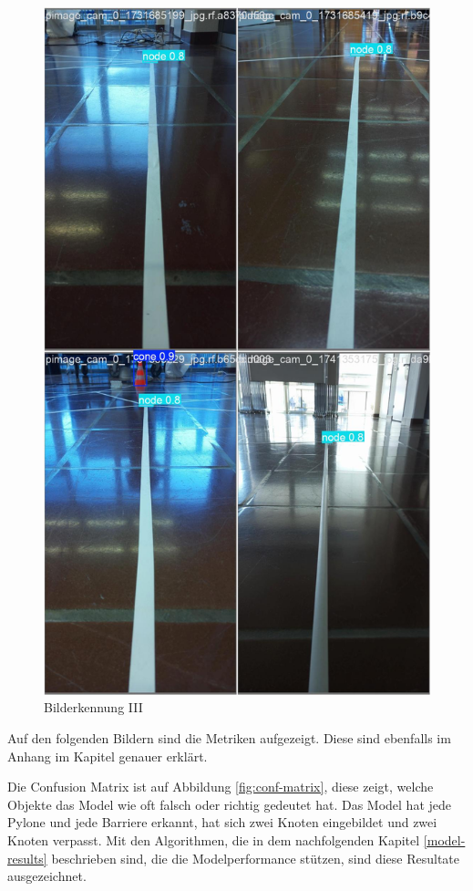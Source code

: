 \begin{figure}[H]
\begin{minipage}[b]{0.28\textwidth}
    \includegraphics[width=\textwidth]{assets/IT/yolo/val_batch2_pred.jpg}
    \caption{Bilderkennung III}
    \label{fig:yolo-iii}
  \end{minipage}
\end{figure}

Auf den folgenden Bildern sind die Metriken aufgezeigt. Diese sind ebenfalls im Anhang im Kapitel  genauer erklärt. 

Die Confusion Matrix ist auf Abbildung \ref{fig:conf-matrix}, diese zeigt, welche Objekte das Model wie oft falsch oder richtig gedeutet hat. Das Model hat jede Pylone und jede Barriere erkannt, hat sich zwei Knoten eingebildet und zwei Knoten verpasst. Mit den Algorithmen, die in dem nachfolgenden Kapitel \ref{model-results} beschrieben sind, die die Modelperformance stützen, sind diese Resultate ausgezeichnet. 


